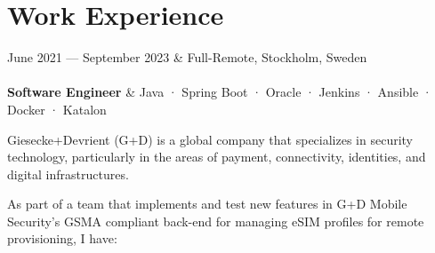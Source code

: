 \documentclass{cv-stylish}
\begin{document}
\begin{center}
\begin{adjustwidth}{1cm}{1cm}



\end{adjustwidth}


\section{Work Experience}


\begin{JobTable}
  June 2021 --- September 2023 & \hfill Full-Remote, Stockholm, Sweden \\
   \\[3pt]
  \hspace{5mm} \textbf{Software Engineer}
  & \hfill Java · Spring Boot · Oracle · Jenkins · Ansible · Docker · Katalon \\
\end{JobTable}
\begin{adjustwidth}{0.015\linewidth}{0.015\linewidth}
Giesecke+Devrient (G+D) is a global company that specializes in
security technology, particularly in the areas of payment,
connectivity, identities, and digital infrastructures.

As part of a team that implements and test new features in G+D Mobile
Security's GSMA compliant back-end for managing eSIM profiles for
remote provisioning, I have:


\end{adjustwidth}
\end{center}
\end{document}

